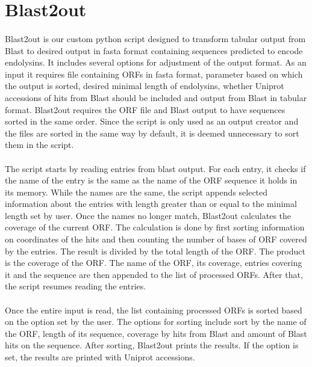 \section{Blast2out}
\paragraph*{}
Blast2out is our custom python script designed to transform tabular output from Blast to desired output in fasta format containing sequences predicted to encode endolysins. It includes several options for adjustment of the output format. As an input it requires file containing ORFs in fasta format, parameter based on which the output is sorted, desired minimal length of endolysins, whether Uniprot accessions of hits from Blast should be included and output from Blast in tabular format. Blast2out requires the ORF file and Blast output to have sequences sorted in the same order. Since the script is only used as an output creator and the files are sorted in the same way by default, it is deemed unnecessary to sort them in the script. 
\paragraph*{}
The script starts by reading entries from blast output. For each entry, it checks if the name of the entry is the same as the name of the ORF sequence it holds in its memory. While the names are the same, the script appends selected information about the entries with length greater than or equal to the minimal length set by user. Once the names no longer match, Blast2out calculates the coverage of the current ORF. The calculation is done by first sorting information on coordinates of the hits and then counting the number of bases of ORF covered by the entries. The result is divided by the total length of the ORF. The product is the coverage of the ORF. The name of the ORF, its coverage, entries covering it and the sequence are then appended to the list of processed ORFs. After that, the script resumes reading the entries.
\paragraph*{}
Once the entire input is read, the list containing processed ORFs is sorted based on the option set by the user. The options for sorting include sort by the name of the ORF, length of its sequence, coverage by hits from Blast and amount of Blast hits on the sequence. After sorting, Blast2out prints the results. If the option is set, the results are printed with Uniprot accessions.

